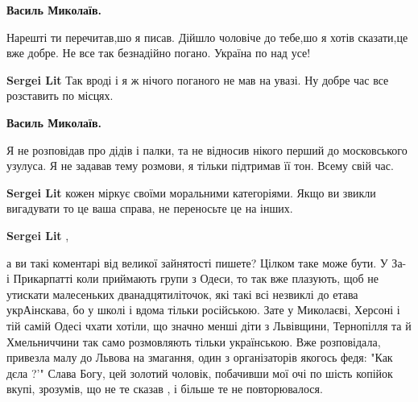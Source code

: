 \begin{itemize}
\begin{itemize}
 
\textbf{Василь Миколаїв.} 

Нарешті ти перечитав,шо я писав. Дійшло чоловіче до тебе,шо я хотів сказати,це
вже добре. Не все так безнадійно погано. Україна по над усе!


 
\textbf{Sergei Lit} Так вроді і я ж нічого поганого не мав на увазі. Ну добре час все розставить по місцях.

 
\textbf{Василь Миколаїв.} 

Я не розповідав про дідів і палки, та не відносив нікого перший до московського
узулуса. Я не задавав тему розмови, я тільки підтримав її тон. Всему свій час.

 
\textbf{Sergei Lit} кожен міркує своїми моральними категоріями. Якщо ви звикли вигадувати то це ваша справа, не переносьте це на інших.

 
\textbf{Sergei Lit} , 

а ви такі коментарі від великої зайнятості пишете? Цілком таке може бути. У За-
і Прикарпатті коли приймають групи з Одеси, то так вже плазують, щоб не
утискати малесеньких дванадцятиліточок, які такі всі незвиклі до етава
укрАінскава, бо у школі і вдома тільки російською. Зате у Миколаєві, Херсоні і
тій самій Одесі чхати хотіли, що значно менші діти з Львівщини, Тернопілля та й
Хмельниччини так само розмовляють тільки українською. Вже розповідала, привезла
малу до Львова на змагання, один з організаторів якогось федя: "Как дєла ?'"
Слава Богу, цей золотий чоловік, побачивши мої очі по шість копійок вкупі,
зрозумів, що не те сказав , і більше те не повторювалося.


\end{itemize}
\end{itemize}
